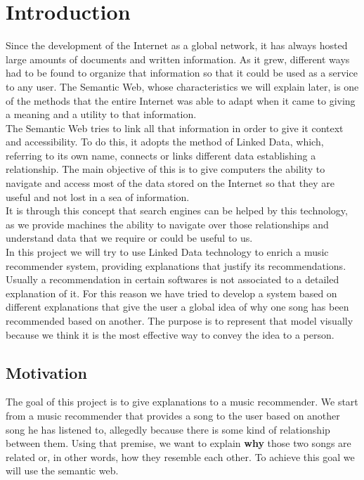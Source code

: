 \chapter{Introduction}
\label{cap:introduction}

Since the development of the Internet as a global network, it has always hosted large amounts of documents and written information. As it grew, different ways had to be found to organize that information so that it could be used as a service to any user. The Semantic Web, whose characteristics we will explain later, is one of the methods that the entire Internet was able to adapt when it came to giving a meaning and a utility to that information.\\

The Semantic Web tries to link all that information in order to give it context and accessibility. To do this, it adopts the method of Linked Data, which, referring to its own name, connects or links different data establishing a relationship. The main objective of this is to give computers the ability to navigate and access most of the data stored on the Internet so that they are useful and not lost in a sea of information.\\

It is through this concept that search engines can be helped by this technology, as we provide machines the ability to navigate over those relationships and understand data that we require or could be useful to us.\\

In this project we will try to use Linked Data technology to enrich a music recommender system, providing explanations that justify its recommendations.\\

Usually a recommendation in certain softwares is not associated to a detailed explanation of it. For this reason we have tried to develop a system based on different explanations that give the user a global idea of why one song has been recommended based on another. The purpose is to represent that model visually because we think it is the most effective way to convey the idea to a person.\\

\section{Motivation}

The goal of this project is to give explanations to a music recommender. We start from a music recommender that provides a song to the user based on another song he has listened to, allegedly because there is some kind of relationship between them. Using that premise, we want to explain \textbf{why} those two songs are related or, in other words, how they resemble each other. To achieve this goal we will use the semantic web.\\

